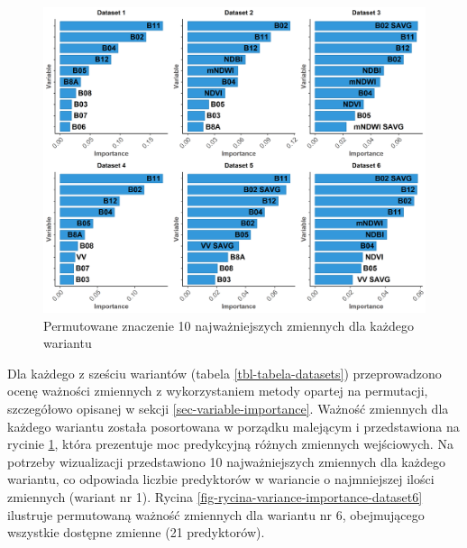 \documentclass{amuthesis}
\begin{document}
\begin{figure}[t]

{\centering \includegraphics[width=1.05\textwidth,height=\textheight]{figures/importance_cowplot.png}

}

\caption{\label{fig-rycina-variance-importance_cowplot}Permutowane
znaczenie 10 najważniejszych zmiennych dla każdego wariantu}

\end{figure}

Dla każdego z sześciu wariantów (tabela \ref{tbl-tabela-datasets})
przeprowadzono ocenę ważności zmiennych z wykorzystaniem metody opartej
na permutacji, szczegółowo opisanej w sekcji
\ref{sec-variable-importance}. Ważność zmiennych dla każdego wariantu
została posortowana w porządku malejącym i przedstawiona na rycinie
\ref{fig-rycina-variance-importance_cowplot}, która prezentuje moc
predykcyjną różnych zmiennych wejściowych. Na potrzeby wizualizacji
przedstawiono 10 najważniejszych zmiennych dla każdego wariantu, co
odpowiada liczbie predyktorów w wariancie o najmniejszej ilości
zmiennych (wariant nr 1). Rycina
\ref{fig-rycina-variance-importance-dataset6} ilustruje permutowaną
ważność zmiennych dla wariantu nr 6, obejmującego wszystkie dostępne
zmienne (21 predyktorów).
\end{document}
